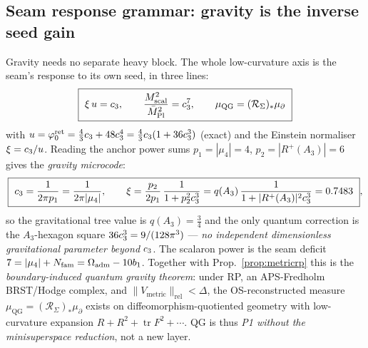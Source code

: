 \subsection{Seam response grammar: gravity is the inverse seed gain}
Gravity needs no separate heavy block. The whole low-curvature axis is the seam's response to its own
seed, in three lines:
\[
  \boxed{\ \xi\,u=c_3,\qquad \frac{M_{\mathrm{scal}}^2}{\bar M_{\mathrm{Pl}}^2}=c_3^7,\qquad
  \mu_{\mathrm{QG}}=(\mathcal R_\Sigma)_*\mu_\partial\ }
\]
with $u=\varphi_0^{\mathrm{ret}}=\tfrac43c_3+48c_3^4=\tfrac43c_3(1+36c_3^3)$ (exact) and the Einstein
normaliser $\xi=c_3/u$. Reading the anchor power sums $p_1=|\mu_4|=4$, $p_2=|R^+(A_3)|=6$ gives the
\emph{gravity microcode}:
\[
  \boxed{\ \cthree=\frac1{2\pi p_1}=\frac1{2\pi|\mu_4|},\qquad
  \xi=\frac{p_2}{2p_1}\,\frac1{1+p_2^2\cthree^3}=q(A_3)\,\frac1{1+|R^+(A_3)|^2\cthree^3}=0.7483\ },
\]
so the gravitational tree value is $q(A_3)=\tfrac34$ and the only quantum correction is the $A_3$-hexagon
square $36c_3^3=9/(128\pi^3)$ --- \emph{no independent dimensionless gravitational parameter beyond}
$c_3$. The scalaron power is the seam deficit $7=|\mu_4|+N_{\mathrm{fam}}=\Omega_{\mathrm{adm}}-10b_1$. Together with
Prop.~\ref{prop:metricrp} this is the
\emph{boundary-induced quantum gravity theorem}: under RP, an APS-Fredholm BRST/Hodge complex, and
$\|V_{\mathrm{metric}}\|_{\mathrm{rel}}<\Delta$, the OS-reconstructed measure $\mu_{\mathrm{QG}}=(\mathcal
R_\Sigma)_*\mu_\partial$ exists on diffeomorphism-quotiented geometry with low-curvature expansion
$R+R^2+\operatorname{tr}F^2+\cdots$. QG is thus \emph{P1 without the minisuperspace reduction}, not a new
layer.

